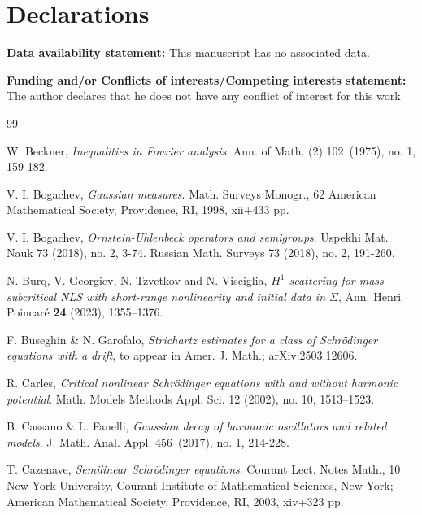 \documentclass[11pt,a4paper]{amsart}
\numberwithin{equation}{section}
\numberwithin{equation}{section}
\begin{document}
\vskip 0.2in

\section{Declarations}

\noindent \textbf{Data availability statement:} This manuscript has no associated data.

\vskip 0.2in

\noindent \textbf{Funding and/or Conflicts of interests/Competing interests statement:} The author declares that he does not have any conflict of interest for this work








\begin{thebibliography}{99}

W. Beckner, \emph{Inequalities in Fourier analysis}. Ann. of Math. (2) 102~(1975), no. 1, 159-182.

V. I. Bogachev, \emph{Gaussian measures}.
Math. Surveys Monogr., 62
American Mathematical Society, Providence, RI, 1998, xii+433 pp.

V. I. Bogachev, \emph{Ornstein-Uhlenbeck operators and semigroups}.
Uspekhi Mat. Nauk 73 (2018), no. 2, 3-74.
Russian Math. Surveys 73 (2018), no. 2, 191-260.

N. Burq, V. Georgiev, N. Tzvetkov and N. Visciglia,
\emph{$H^1$ scattering for mass-subcritical NLS with short-range
nonlinearity and initial data in $\Sigma$},
Ann. Henri Poincar\'e \textbf{24} (2023), 1355--1376.

F. Buseghin \& N. Garofalo,
\emph{Strichartz estimates for a class of Schr\"odinger equations with a drift},
to appear in Amer. J. Math.; arXiv:2503.12606.

R. Carles, \emph{Critical nonlinear Schr\"odinger equations with and without harmonic potential}.
Math. Models Methods Appl. Sci. 12 (2002), no. 10, 1513--1523.

B. Cassano \& L. Fanelli, \emph{Gaussian decay of harmonic oscillators and related models}.
J. Math. Anal. Appl. 456~(2017), no. 1, 214-228.

 T. Cazenave, \emph{Semilinear Schr\"odinger equations}. Courant Lect. Notes Math., 10
New York University, Courant Institute of Mathematical Sciences, New York; American Mathematical Society, Providence, RI, 2003, xiv+323 pp.


\end{thebibliography}
\end{document}

